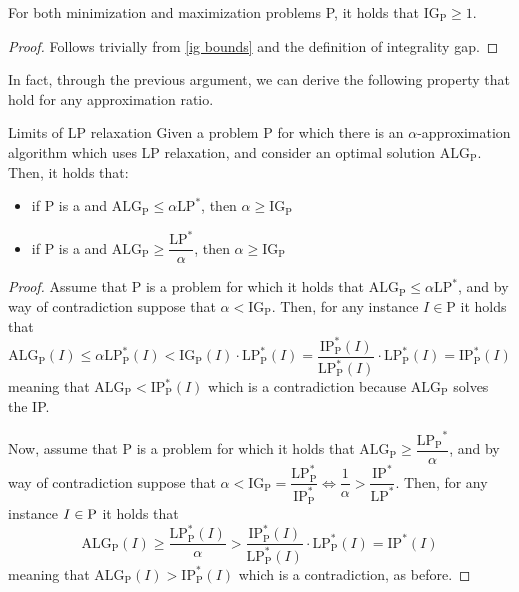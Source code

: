 \documentclass[a4paper, 12pt]{report}
\begin{document}
    \begin{framedprop}{}
        For both minimization and maximization problems P, it holds that $\mathrm{IG_P} \ge 1$.
    \end{framedprop}

    \begin{proof}
        Follows trivially from \cref{ig bounds} and the definition of integrality gap.
    \end{proof}

    In fact, through the previous argument, we can derive the following property that  hold for any approximation ratio.

    \begin{framedprop}{Limits of LP relaxation}
        Given a problem P for which there is an $\alpha$-approximation algorithm which uses LP relaxation, and consider an optimal  solution $\mbox{ALG}_{\mathrm{P}}$. Then, it holds that:

        \begin{itemize}
            \item if P is a  and $\mbox{ALG}_{\mathrm P} \le \alpha \mbox{LP}^*$, then $\alpha \ge \mathrm{IG_P}$
            \item if P is a  and $\mathrm{ALG_P} \ge \dfrac{\mathrm{LP}^*}{\alpha}$, then $\alpha \ge \mathrm{IG_P}$
        \end{itemize}
    \end{framedprop}

    \begin{proof}
        Assume that P is a  problem for which it holds that $\mathrm{ALG_P} \le \alpha \mathrm{LP}^*$, and by way of contradiction suppose that $\alpha < \mathrm{IG_P}$. Then, for any instance $I \in \mathrm P$ it holds that $$\mathrm{ALG_P}(I) \le \alpha \mathrm{LP_P^*}(I) < \mathrm{IG_P}(I) \cdot \mathrm{LP_P^*}(I) = \dfrac{\mathrm{IP^*_P}(I)}{\mathrm{LP_P^*}(I)} \cdot \mathrm{LP_P^*}(I) = \mathrm{IP_P^*}(I)$$ meaning that $\mathrm{ALG_P} < \mathrm{IP_P^*}(I)$ which is a contradiction because $\mathrm{ALG_P}$ solves the IP.

        Now, assume that P is a  problem for which it holds that $\mathrm{ALG_P} \ge \dfrac{\mathrm{LP_P}^*}{\alpha}$, and by way of contradiction suppose that $\alpha < \mathrm{IG_P} = \dfrac{\mathrm{LP_P^*}}{\mathrm{IP_P^*}} \iff \dfrac{1}{\alpha} > \dfrac{\mbox{IP}^*}{\mbox{LP}^*}$. Then, for any instance $I \in \mbox P$ it holds that $$\mathrm{ALG_P}(I) \ge \dfrac{\mathrm{LP_P^*}(I)}{\alpha} > \dfrac{\mathrm{IP_P^*}(I)}{\mathrm{LP_P^*}(I)} \cdot \mathrm{LP_P^*}(I) = \mathrm{IP}^*(I)$$ meaning that $\mathrm{ALG_P}(I) > \mathrm{IP_P^*}(I)$ which is a contradiction, as before.
    \end{proof}
\end{document}
